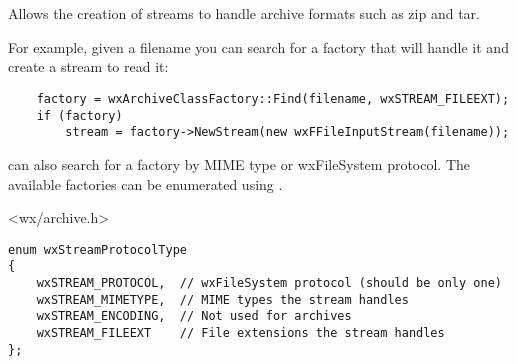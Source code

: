 %
%

\section{}\label{wxarchiveclassfactory}

Allows the creation of streams to handle archive formats such
as zip and tar.

For example, given a filename you can search for a factory that will
handle it and create a stream to read it:

\begin{verbatim}
    factory = wxArchiveClassFactory::Find(filename, wxSTREAM_FILEEXT);
    if (factory)
        stream = factory->NewStream(new wxFFileInputStream(filename));

\end{verbatim}

 can also search
for a factory by MIME type or wxFileSystem protocol.
The available factories can be enumerated
using .




<wx/archive.h>




\begin{verbatim}
enum wxStreamProtocolType
{
    wxSTREAM_PROTOCOL,  // wxFileSystem protocol (should be only one)
    wxSTREAM_MIMETYPE,  // MIME types the stream handles
    wxSTREAM_ENCODING,  // Not used for archives
    wxSTREAM_FILEEXT    // File extensions the stream handles
};

\end{verbatim}


\\
\\
\\
\\
\\

